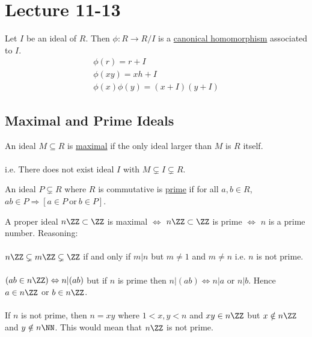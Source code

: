 \documentclass[class=scrartcl, crop=false]{standalone}
\date{2019-11-13}
\begin{document}
\section{Lecture 11-13}

\begin{definition}
  Let $I$ be an ideal of $R$. Then $\phi: R \to R / I$ is a \ul{canonical homomorphism} associated to $I$.
  \begin{gather*}
    \phi(r) = r + I \\
    \phi(xy) = xh + I \\
    \phi(x) \phi(y) = (x + I)(y + I)
  \end{gather*} 
\end{definition} 

\subsection{Maximal and Prime Ideals}

\begin{definition}
  
An ideal $M \subseteq R$ is \ul{maximal} if the only ideal larger than $M$ is $R$ itself.
\\\\
i.e. There does not exist ideal $I$ with $M \subsetneq I \subsetneq R$.
\end{definition} 

\begin{definition}
  An ideal $P \subsetneq R$ where $R$ is commutative is \ul{prime} if for all $a, b \in R$, $ab \in P \Rightarrow [a \in P \ \text{or} \ b \in P]$. 
\end{definition} 
\begin{example}
  A proper ideal $n\ZZ \subset \ZZ$ is maximal $\Leftrightarrow$ $n\ZZ \subset \ZZ$ is prime $\Leftrightarrow$ $n$ is a prime number. Reasoning:
  \\\\
  $n\ZZ \subsetneq m\ZZ \subsetneq \ZZ$ if and only if $m | n$ but $m \neq 1$ and $m \neq n$ i.e. $ n$ is not prime.
  \\\\
  $(ab \in n\ZZ) \Leftrightarrow n | (ab)$ but if $n$ is prime then $n | (ab) \Leftrightarrow n | a$ or $n | b$. Hence $a \in n\ZZ$ or $b \in n\ZZ$.
  \\\\
  If $n$ is not prime, then $n = xy$ where $1 < x, y < n$ and $xy \in n\ZZ$ but $x \notin n \ZZ$ and $y \notin n\NN$. This would mean that $n\ZZ$ is not prime.
\end{example} 
\end{document}

